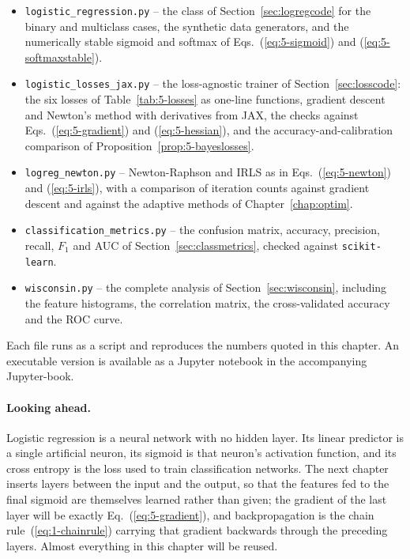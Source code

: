 \begin{itemize}
  \item \texttt{logistic\_regression.py} -- the class of
        Section~\ref{sec:logregcode} for the binary and multiclass cases, the
        synthetic data generators, and the numerically stable sigmoid and
        softmax of Eqs.~(\ref{eq:5-sigmoid}) and (\ref{eq:5-softmaxstable}).
  \item \texttt{logistic\_losses\_jax.py} -- the loss-agnostic trainer of
        Section~\ref{sec:losscode}: the six losses of Table~\ref{tab:5-losses}
        as one-line functions, gradient descent and Newton's method with
        derivatives from JAX, the checks against Eqs.~(\ref{eq:5-gradient})
        and (\ref{eq:5-hessian}), and the accuracy-and-calibration
        comparison of Proposition~\ref{prop:5-bayeslosses}.
  \item \texttt{logreg\_newton.py} -- Newton-Raphson and IRLS as in
        Eqs.~(\ref{eq:5-newton}) and (\ref{eq:5-irls}), with a comparison of
        iteration counts against gradient descent and against the adaptive
        methods of Chapter~\ref{chap:optim}.
  \item \texttt{classification\_metrics.py} -- the confusion matrix, accuracy,
        precision, recall, $F_1$ and AUC of Section~\ref{sec:classmetrics},
        checked against \texttt{scikit-learn}.
  \item \texttt{wisconsin.py} -- the complete analysis of
        Section~\ref{sec:wisconsin}, including the feature histograms, the
        correlation matrix, the cross-validated accuracy and the ROC curve.
\end{itemize}

Each file runs as a script and reproduces the numbers quoted in this chapter.
An executable version is available as a Jupyter notebook in the accompanying
Jupyter-book.

\paragraph{Looking ahead.}
Logistic regression is a neural network with no hidden layer.  Its linear
predictor is a single artificial neuron, its sigmoid is that neuron's
activation function, and its cross entropy is the loss used to train
classification networks.  The next chapter inserts layers between the input and
the output, so that the features fed to the final sigmoid are themselves
learned rather than given; the gradient of the last layer will be exactly
Eq.~(\ref{eq:5-gradient}), and backpropagation is the chain
rule~(\ref{eq:1-chainrule}) carrying that gradient backwards through the
preceding layers.  Almost everything in this chapter will be reused.

